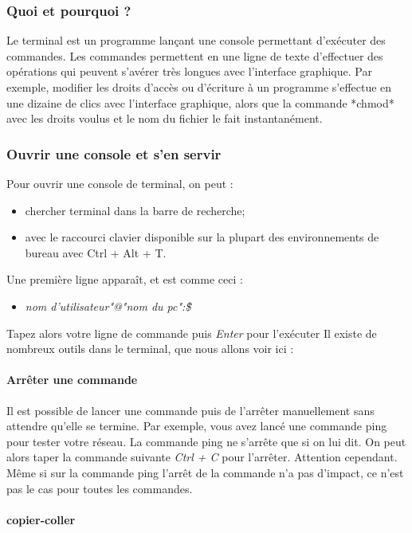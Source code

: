 \subsubsection{Quoi et pourquoi ?}
Le terminal est un programme lançant une console permettant d'exécuter des commandes.
 Les commandes permettent en une ligne de texte d'effectuer des opérations qui peuvent
 s'avérer très longues avec l'interface graphique. Par exemple, modifier les droits d'accès ou d'écriture à un programme
 s'effectue en une dizaine de clics avec l'interface graphique, alors que la commande *chmod* avec les droits voulus et
 le nom du fichier le fait instantanément.

\subsubsection{Ouvrir une console et s'en servir}
Pour ouvrir une console de terminal, on peut :

\begin{itemize}
\item chercher terminal dans la barre de recherche;
\item avec le raccourci clavier disponible sur la plupart des environnements de bureau avec Ctrl + Alt + T.
\end{itemize}

Une première ligne apparaît, et est comme ceci :

\begin{itemize}
\item \textit{nom d'utilisateur"@"nom du pc":\~\$}
\end{itemize}

Tapez alors votre ligne de commande puis \textit{Enter} pour l'exécuter
Il existe de nombreux outils dans le terminal, que nous allons voir ici :
\paragraph{Arrêter une commande}

Il est possible de lancer une commande puis de l'arrêter manuellement sans attendre qu'elle se termine.
 Par exemple, vous avez lancé une commande ping pour tester votre réseau. La commande ping ne s'arrête que si on lui dit.
  On peut alors taper la commande suivante \textit{Ctrl + C} pour l'arrêter. Attention cependant.
   Même si sur la commande ping l'arrêt de la commande n'a pas d'impact, ce n'est pas le cas pour toutes les commandes.

\paragraph{copier-coller}


